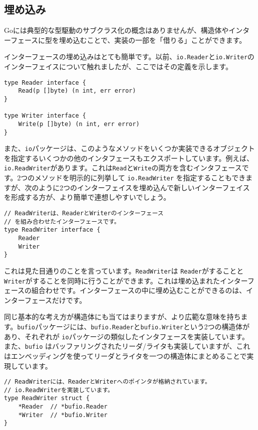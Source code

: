 \documentclass{jsarticle}
\begin{document}
\subsection{埋め込み}

Goには典型的な型駆動のサブクラス化の概念はありませんが、構造体やインターフェースに型を埋め込むことで、実装の一部を「借りる」ことができます。

インターフェースの埋め込みはとても簡単です。以前、\texttt{io.Reader}と\texttt{io.Writer}のインターフェイスについて触れましたが、ここではその定義を示します。

\begin{lstlisting}[numbers=none]
type Reader interface {
    Read(p []byte) (n int, err error)
}

type Writer interface {
    Write(p []byte) (n int, err error)
}
\end{lstlisting}

また、\texttt{io}パッケージは、このようなメソッドをいくつか実装できるオブジェクトを指定するいくつかの他のインタフェースもエクスポートしています。例えば、\texttt{io.ReadWriter}があります。これは\texttt{Read}と\texttt{Write}の両方を含むインタフェースです。2つのメソッドを明示的に列挙して
\texttt{io.ReadWriter}
を指定することもできますが、次のように2つのインターフェイスを埋め込んで新しいインターフェイスを形成する方が、より簡単で連想しやすいでしょう。

\begin{lstlisting}[numbers=none]
// ReadWriterは、ReaderとWriterのインターフェース
// を組み合わせたインターフェースです。
type ReadWriter interface {
    Reader
    Writer
}
\end{lstlisting}

これは見た目通りのことを言っています。\texttt{ReadWriter}は
\texttt{Reader}がすることと
\texttt{Writer}がすることを同時に行うことができます。これは埋め込まれたインターフェースの組合わせです。インターフェースの中に埋め込むことができるのは、インターフェースだけです。

同じ基本的な考え方が構造体にも当てはまりますが、より広範な意味を持ちます。\texttt{bufio}パッケージには、\texttt{bufio.Reader}と\texttt{bufio.Writer}という2つの構造体があり、それぞれが
\texttt{io}パッケージの類似したインタフェースを実装しています。また、\texttt{bufio}
はバッファリングされたリーダ/ライタも実装していますが、これはエンベッディングを使ってリーダとライタを一つの構造体にまとめることで実現しています。

\begin{lstlisting}[numbers=none]
// ReadWriterには、ReaderとWriterへのポインタが格納されています。
// io.ReadWriterを実装しています。
type ReadWriter struct {
    *Reader  // *bufio.Reader
    *Writer  // *bufio.Writer
}
\end{lstlisting}
\end{document}
